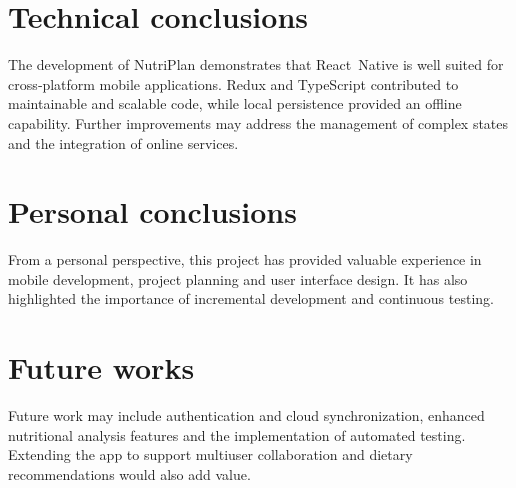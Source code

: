 \documentclass[twoside, openright, 11pt]{report}
\begin{document}
\section{Technical conclusions}
The development of NutriPlan demonstrates that React Native is well suited for cross‑platform mobile applications. Redux and TypeScript contributed to maintainable and scalable code, while local persistence provided an offline capability. Further improvements may address the management of complex states and the integration of online services.

\section{Personal conclusions}
From a personal perspective, this project has provided valuable experience in mobile development, project planning and user interface design. It has also highlighted the importance of incremental development and continuous testing.

\section{Future works}
Future work may include authentication and cloud synchronization, enhanced nutritional analysis features and the implementation of automated testing. Extending the app to support multiuser collaboration and dietary recommendations would also add value.

\cleardoublepage
{}


\end{document}
